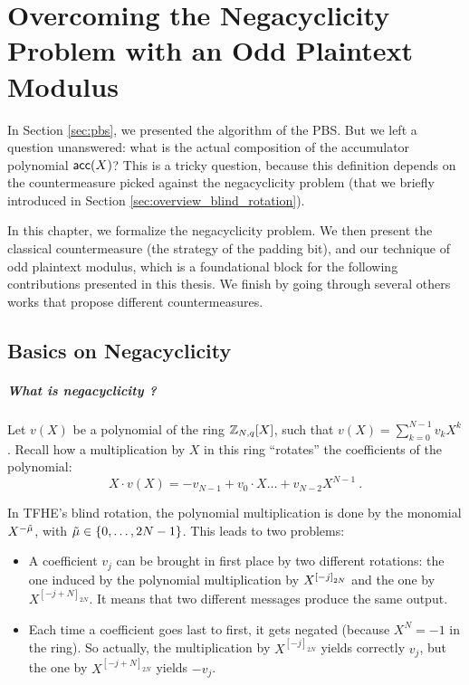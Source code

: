 
\chapter[The Negacyclicity Problem]{Overcoming the Negacyclicity Problem with an Odd Plaintext Modulus}
\label{chap:negacyclicity}


In Section \ref{sec:pbs}, we presented the algorithm of the \gls{PBS}. But we left a question unanswered: what is the actual composition of the accumulator polynomial $\textsf{acc}(X)$? This is a tricky question, because this definition depends on the countermeasure picked against the negacyclicity problem (that we briefly introduced in Section \ref{sec:overview_blind_rotation}). 


In this chapter, we formalize the negacyclicity problem. We then present the classical countermeasure (the strategy of the padding bit), and our technique of odd plaintext modulus, which is a foundational block for the following contributions presented in this thesis. We finish by going through several others works that propose different countermeasures.


\section{Basics on Negacyclicity}

\paragraph{What is negacyclicity ?}

Let $v(X)$ be a polynomial of the ring $\mathbb{Z}_{N,q}[X]$, such that $v(X) = \sum_{k=0}^{N-1} v_k X^k$. Recall how a multiplication by $X$  in this ring ``rotates'' the coefficients of the polynomial: \[X \cdot v(X) = - v_{N - 1} + v_0 \cdot X \dots + v_{N - 2} X^{N - 1}~.\]

In \gls{TFHE}'s blind rotation, the polynomial multiplication is done by the monomial $X^{-\Tilde{\mu}}$, with $\Tilde{\mu} \in \left \lbrace 0, \dots, 2N - 1 \right \rbrace$. This leads to two problems:

\begin{itemize}
	\item A coefficient $v_j$ can be brought in first place by two different rotations: the one induced by the polynomial multiplication by $X^{\left [ -j \right ]_{2N}}$ and the one by $X^{[-j + N]_{2N}}$. It means that two different messages produce the same output.
	\item Each time a coefficient goes last to first, it gets negated (because $X^N = -1$ in the ring). So actually, the multiplication by $X^{[-j]_{2N}}$ yields correctly $v_j$, but the one by $X^{[-j + N]_{2N}}$ yields $-v_j$.
\end{itemize}


